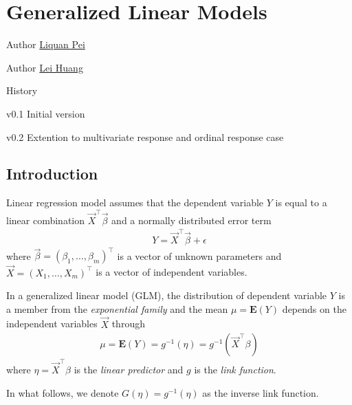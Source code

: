
\chapter[Generalized Linear Models]{Generalized Linear Models}

\begin{moduleinfo}
\item[Author] \href{mailto:lpei@gopivotal.com}{Liquan Pei}
\item[Author] \href{mailto:lhuang@pivotal.io}{Lei Huang}
\item[History]
    \begin{modulehistory}
        \item[v0.1] Initial version
        \item[v0.2] Extention to multivariate response and ordinal response case
    \end{modulehistory}
\end{moduleinfo}


\section{Introduction}

Linear regression model assumes that the dependent variable $Y$ is equal to a linear combination $\vec{X}^\top \vec{\beta}$ and a normally distributed error term
\begin{align*}
Y = \vec{X}^\top \vec{\beta} + \epsilon
\end{align*}
where $\vec{\beta} = (\beta_{1}, \dots, \beta_{m})^\top$ is a vector of unknown parameters and $\vec{X} = (X_1, \dots, X_{m})^\top$ is a vector of independent variables.

In a generalized linear model (GLM), the distribution of dependent variable $Y$ is a member from the \emph{exponential family} and the mean $\mu = \mathbf{E}(Y)$ depends on the independent variables $\vec{X}$ through
\begin{align*}
\mu = \mathbf{E}(Y) = g^{-1}(\eta) =g^{-1}(\vec{X}^\top \beta)
\end{align*}
where $\eta = \vec{X}^\top \beta$ is the \emph{linear predictor} and $g$ is the \emph{link function}.

In what follows, we denote $G(\eta) = g^{-1}(\eta)$ as the inverse link function.

